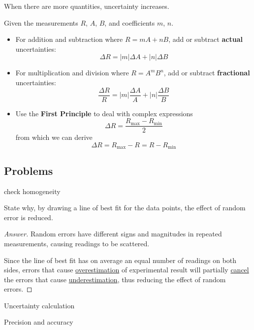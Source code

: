 When there are more quantities, uncertainty increases.

Given the measurements $R$, $A$, $B$, and coefficients $m$, $n$.
\begin{itemize}
\item For addition and subtraction where $R = mA + nB$, add or subtract \textbf{actual} uncertainties:
\begin{equation} \Delta R = |m| \Delta A + |n| \Delta B \end{equation}

\item For multiplication and division where $R = A^m B^n$, add or subtract \textbf{fractional} uncertainties:
\begin{equation} \frac{\Delta R}{R} = |m| \frac{\Delta A}{A} + |n| \frac{\Delta B}{B} \end{equation}

\item Use the \textbf{First Principle} to deal with complex expressions 
\begin{equation} \Delta R = \frac{R_{\mathrm{max}} - R_{\mathrm{min}}}{2} \end{equation}
from which we can derive 
\[ \Delta R = R_{\mathrm{max}} - R = R - R_{\mathrm{min}} \]
\end{itemize}
\pagebreak

\subsection{Problems}
\begin{prbm}
check homogeneity
\end{prbm}

\begin{prbm}
State why, by drawing a line of best fit for the data points, the effect of random error is reduced.
\end{prbm}

\begin{proof}[Answer]
Random errors have different signs and magnitudes in repeated measurements, causing readings to be scattered.

Since the line of best fit has on average an equal number of readings on both sides, errors that cause \underline{overestimation} of experimental result will partially \underline{cancel} the errors that cause \underline{underestimation}, thus reducing the effect of random errors.
\end{proof}

\begin{prbm}
Uncertainty calculation
\end{prbm}

\begin{prbm}
Precision and accuracy
\end{prbm}
\pagebreak